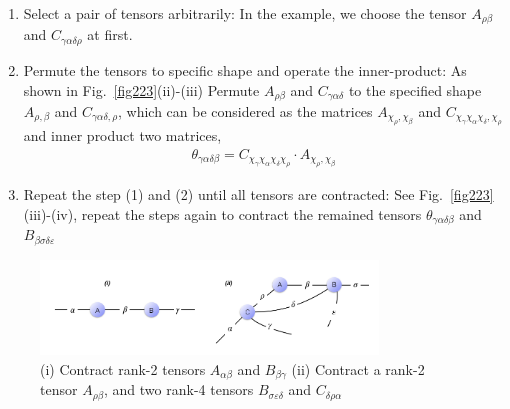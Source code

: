 \begin{enumerate}

	\item Select a pair of tensors arbitrarily: In the example, we choose the tensor $A_{\rho \beta}$ and $C_{\gamma \alpha \delta \rho}$ at first. 
	\item Permute the tensors to specific shape and operate the inner-product: As shown in Fig.~\ref{fig223}(ii)-(iii) Permute $A_{\rho \beta}$ and $C_{\gamma \alpha \delta}$ to the specified shape $A_{\rho, \beta}$ and $C_{\gamma \alpha \delta, \rho}$, which can be considered as the matrices $A_{\chi_{\rho},\chi_{\beta}}$ and $C_{\chi_{\gamma} \chi_{\alpha} \chi_{\delta}, \chi_{\rho}}$ and inner product two matrices, 
		\begin{align}
			\theta_{\gamma \alpha \delta \beta} = C_{\chi_{\gamma} \chi_{\alpha} \chi_{\delta} \chi_{\rho}} \cdot A_{\chi_{\rho}, \chi_{\beta}}
		\end{align}
	\item Repeat the step (1) and (2) until all tensors are contracted: See Fig.~\ref{fig223}(iii)-(iv), repeat the steps again to contract the remained tensors $\theta_{\gamma \alpha \delta \beta}$ and $B_{\beta \sigma \delta \varepsilon}$
\end{enumerate}

\begin{figure}[H]
	\centering
	\includegraphics[width=0.80\textwidth]{figures/fig222.png}
	\caption[The examples of tensor diagrams.]{(i) Contract rank-2 tensors $A_{\alpha \beta}$ and $B_{\beta \gamma} $ (ii) Contract a rank-2 tensor $A_{\rho \beta}$, and two rank-4 tensors $B_{\sigma \varepsilon \delta}$ and $C_{\delta \rho \alpha}$}
	\label{fig222}
\end{figure}

